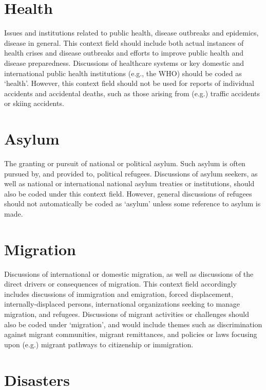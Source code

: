 \documentclass[11pt]{report}
\begin{document}
\section{Health}\label{context:health}

Issues and institutions related to public health, disease outbreaks and epidemics, disease in general. This context field should include both actual instances of health crises and disease outbreaks and efforts to improve public health and disease preparedness. Discussions of healthcare systems or key domestic and international public health institutions (e.g., the WHO) should be coded as `health'. However, this context field should not be used for reports of individual accidents and accidental deaths, such as those arising from (e.g.) traffic accidents or skiing accidents.

\section{Asylum}\label{context:asylum}

The granting or pursuit of national or political asylum. Such asylum is often pursued by, and provided to, political refugees. Discussions of asylum seekers, as well as national or international national asylum treaties or institutions, should also be coded under this context field. However, general discussions of refugees should not automatically be coded as `asylum' unless some reference to asylum is made.


\section{Migration}\label{context:migration}

Discussions of international or domestic migration, as well as discussions of the direct drivers or consequences of migration. This context field accordingly includes discussions of immigration and emigration, forced displacement, internally-displaced persons, international organizations seeking to manage migration, and refugees. Discussions of migrant activities or challenges should also be coded under `migration', and would include themes such as discrimination against migrant communities, migrant remittances, and policies or laws focusing upon (e.g.) migrant pathways to citizenship or immigration.

\section{Disasters}\label{context:disasters}
\end{document}
